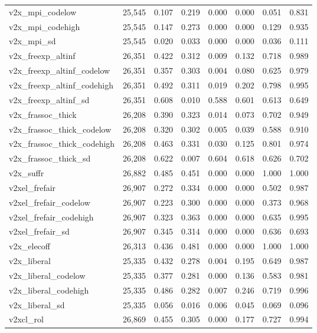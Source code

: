\begin{table}[!htbp]
\begin{tabular}{@{\extracolsep{5pt}}lccccccc}
v2x\_mpi\_codelow & 25,545 & 0.107 & 0.219 & 0.000 & 0.000 & 0.051 & 0.831 \\ 
v2x\_mpi\_codehigh & 25,545 & 0.147 & 0.273 & 0.000 & 0.000 & 0.129 & 0.935 \\ 
v2x\_mpi\_sd & 25,545 & 0.020 & 0.033 & 0.000 & 0.000 & 0.036 & 0.111 \\ 
v2x\_freexp\_altinf & 26,351 & 0.422 & 0.312 & 0.009 & 0.132 & 0.718 & 0.989 \\ 
v2x\_freexp\_altinf\_codelow & 26,351 & 0.357 & 0.303 & 0.004 & 0.080 & 0.625 & 0.979 \\ 
v2x\_freexp\_altinf\_codehigh & 26,351 & 0.492 & 0.311 & 0.019 & 0.202 & 0.798 & 0.995 \\ 
v2x\_freexp\_altinf\_sd & 26,351 & 0.608 & 0.010 & 0.588 & 0.601 & 0.613 & 0.649 \\ 
v2x\_frassoc\_thick & 26,208 & 0.390 & 0.323 & 0.014 & 0.073 & 0.702 & 0.949 \\ 
v2x\_frassoc\_thick\_codelow & 26,208 & 0.320 & 0.302 & 0.005 & 0.039 & 0.588 & 0.910 \\ 
v2x\_frassoc\_thick\_codehigh & 26,208 & 0.463 & 0.331 & 0.030 & 0.125 & 0.801 & 0.974 \\ 
v2x\_frassoc\_thick\_sd & 26,208 & 0.622 & 0.007 & 0.604 & 0.618 & 0.626 & 0.702 \\ 
v2x\_suffr & 26,882 & 0.485 & 0.451 & 0.000 & 0.000 & 1.000 & 1.000 \\ 
v2xel\_frefair & 26,907 & 0.272 & 0.334 & 0.000 & 0.000 & 0.502 & 0.987 \\ 
v2xel\_frefair\_codelow & 26,907 & 0.223 & 0.300 & 0.000 & 0.000 & 0.373 & 0.968 \\ 
v2xel\_frefair\_codehigh & 26,907 & 0.323 & 0.363 & 0.000 & 0.000 & 0.635 & 0.995 \\ 
v2xel\_frefair\_sd & 26,907 & 0.345 & 0.314 & 0.000 & 0.000 & 0.636 & 0.693 \\ 
v2x\_elecoff & 26,313 & 0.436 & 0.481 & 0.000 & 0.000 & 1.000 & 1.000 \\ 
v2x\_liberal & 25,335 & 0.432 & 0.278 & 0.004 & 0.195 & 0.649 & 0.987 \\ 
v2x\_liberal\_codelow & 25,335 & 0.377 & 0.281 & 0.000 & 0.136 & 0.583 & 0.981 \\ 
v2x\_liberal\_codehigh & 25,335 & 0.486 & 0.282 & 0.007 & 0.246 & 0.719 & 0.996 \\ 
v2x\_liberal\_sd & 25,335 & 0.056 & 0.016 & 0.006 & 0.045 & 0.069 & 0.096 \\ 
v2xcl\_rol & 26,869 & 0.455 & 0.305 & 0.000 & 0.177 & 0.727 & 0.994 \\ 

\end{tabular}
\end{table}
